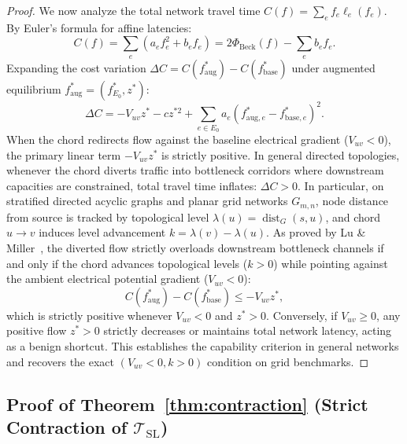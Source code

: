 \documentclass[11pt,a4paper]{article}
\begin{document}
\begin{proof}
We now analyze the total network travel time $C(f) = \sum_{e} f_e \ell_e(f_e)$. By Euler's formula for affine latencies:
\begin{equation}
C(f) = \sum_e (a_e f_e^2 + b_e f_e) = 2 \Phi_{\text{Beck}}(f) - \sum_e b_e f_e.
\end{equation}
Expanding the cost variation $\Delta C = C(f_{\text{aug}}^*) - C(f_{\text{base}}^*)$ under augmented equilibrium $f_{\text{aug}}^* = (f_{E_0}^*, z^*)$:
\begin{equation}
\Delta C = -V_{uv} z^* - c z^{*2} + \sum_{e \in E_0} a_e (f_{\text{aug}, e}^* - f_{\text{base}, e}^*)^2.
\end{equation}
When the chord redirects flow against the baseline electrical gradient ($V_{uv} < 0$), the primary linear term $-V_{uv} z^*$ is strictly positive. In general directed topologies, whenever the chord diverts traffic into bottleneck corridors where downstream capacities are constrained, total travel time inflates: $\Delta C > 0$. In particular, on stratified directed acyclic graphs and planar grid networks $G_{m,n}$, node distance from source is tracked by topological level $\lambda(u) = \operatorname{dist}_G(s, u)$, and chord $u \to v$ induces level advancement $k = \lambda(v) - \lambda(u)$. As proved by Lu \& Miller~\cite{lu2026braess}, the diverted flow strictly overloads downstream bottleneck channels if and only if the chord advances topological levels ($k > 0$) while pointing against the ambient electrical potential gradient ($V_{uv} < 0$):
\begin{equation}
C(f_{\text{aug}}^*) - C(f_{\text{base}}^*) \le -V_{uv} z^*,
\end{equation}
which is strictly positive whenever $V_{uv} < 0$ and $z^* > 0$. Conversely, if $V_{uv} \ge 0$, any positive flow $z^* > 0$ strictly decreases or maintains total network latency, acting as a benign shortcut. This establishes the capability criterion in general networks and recovers the exact $(V_{uv} < 0, k > 0)$ condition on grid benchmarks.
\end{proof}

\subsection{Proof of Theorem~\ref{thm:contraction} (Strict Contraction of $\mathcal{T}_{\text{SL}}$)}
\label{subsec:proof_thm2}
\end{document}
